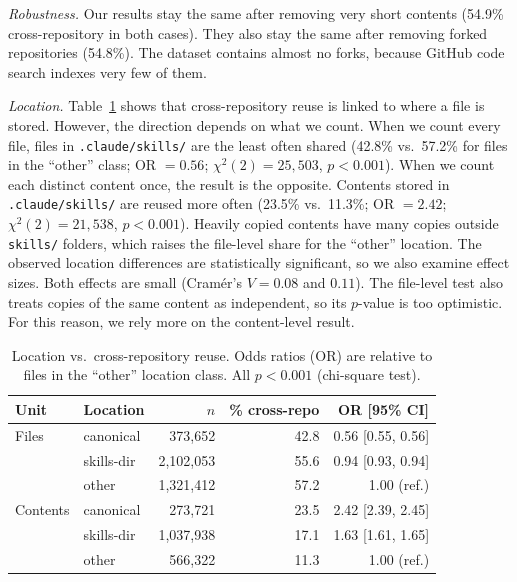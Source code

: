 \documentclass[sigconf,review]{acmart}
\begin{document}
\emph{Robustness.}
Our results stay the same after removing very short contents (54.9\% cross-repository in both cases).
They also stay the same after removing forked repositories (54.8\%).
The dataset contains almost no forks, because GitHub code search indexes very few of them.

\emph{Location.}
Table~\ref{tab:rq1-location} shows that cross-repository reuse is linked to where a file is stored.
However, the direction depends on what we count.
When we count every file, files in \texttt{.claude/skills/} are the least often shared (42.8\% vs.\ 57.2\% for files in the ``other'' class; OR $= 0.56$; $\chi^2(2)=25{,}503$, $p<0.001$).
When we count each distinct content once, the result is the opposite.
Contents stored in \texttt{.claude/skills/} are reused more often (23.5\% vs.\ 11.3\%; OR $= 2.42$; $\chi^2(2)=21{,}538$, $p<0.001$).
Heavily copied contents have many copies outside \texttt{skills/} folders, which raises the file-level share for the ``other'' location.
The observed location differences are statistically significant,
so we also examine effect sizes.
Both effects are small (Cram\'er's $V = 0.08$ and $0.11$).
The file-level test also treats copies of the same content as independent, so its $p$-value is too optimistic.
For this reason, we rely more on the content-level result.

\begin{table}[t]
  \caption{Location vs.\ cross-repository reuse. Odds ratios (OR) are relative to files in the ``other'' location class. All $p<0.001$ (chi-square test).}
  \label{tab:rq1-location}
  \centering
  \small
  \begin{tabular}{llrrr}
    \toprule
    Unit & Location & $n$ & \% cross-repo & OR [95\% CI] \\
    \midrule
    Files    & canonical  & 373{,}652     & 42.8 & 0.56 [0.55, 0.56] \\
             & skills-dir & 2{,}102{,}053 & 55.6 & 0.94 [0.93, 0.94] \\
             & other      & 1{,}321{,}412 & 57.2 & 1.00 (ref.) \\
    \midrule
    Contents & canonical  & 273{,}721     & 23.5 & 2.42 [2.39, 2.45] \\
             & skills-dir & 1{,}037{,}938 & 17.1 & 1.63 [1.61, 1.65] \\
             & other      & 566{,}322     & 11.3 & 1.00 (ref.) \\
    \bottomrule
  \end{tabular}
\end{table}
\end{document}
